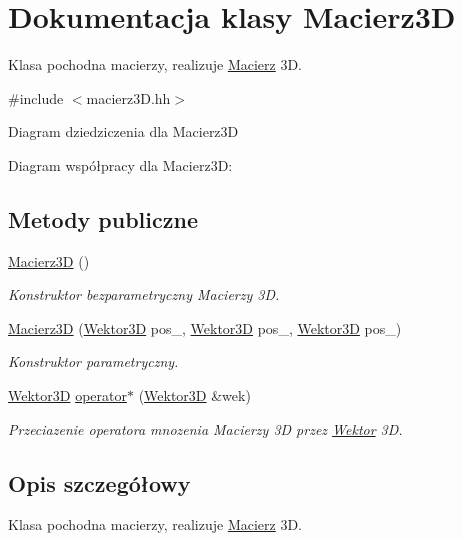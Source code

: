 \hypertarget{class_macierz3_d}{}\section{Dokumentacja klasy Macierz3D}
\label{class_macierz3_d}


Klasa pochodna macierzy, realizuje \hyperlink{class_macierz}{Macierz} 3D.  




{\ttfamily \#include $<$macierz3\+D.\+hh$>$}



Diagram dziedziczenia dla Macierz3D


Diagram współpracy dla Macierz3D\+:
\subsection*{Metody publiczne}
\begin{DoxyCompactItemize}
\item 
\hyperlink{class_macierz3_d_a87e295bc44d70307c0906a2daa726367}{Macierz3D} ()
\begin{DoxyCompactList}\small\item\em Konstruktor bezparametryczny Macierzy 3D. \end{DoxyCompactList}\item 
\hyperlink{class_macierz3_d_a7b98d42274e7ee724188d00dffdcd69b}{Macierz3D} (\hyperlink{class_wektor3_d}{Wektor3D} pos\+\_, \hyperlink{class_wektor3_d}{Wektor3D} pos\+\_, \hyperlink{class_wektor3_d}{Wektor3D} pos\+\_)
\begin{DoxyCompactList}\small\item\em Konstruktor parametryczny. \end{DoxyCompactList}\item 
\hyperlink{class_wektor3_d}{Wektor3D} \hyperlink{class_macierz3_d_a3896e21fc7cf77a172c413738c5fccbd}{operator$\ast$} (\hyperlink{class_wektor3_d}{Wektor3D} \&wek)
\begin{DoxyCompactList}\small\item\em Przeciazenie operatora mnozenia Macierzy 3D przez \hyperlink{class_wektor}{Wektor} 3D. \end{DoxyCompactList}\end{DoxyCompactItemize}


\subsection{Opis szczegółowy}
Klasa pochodna macierzy, realizuje \hyperlink{class_macierz}{Macierz} 3D. 

